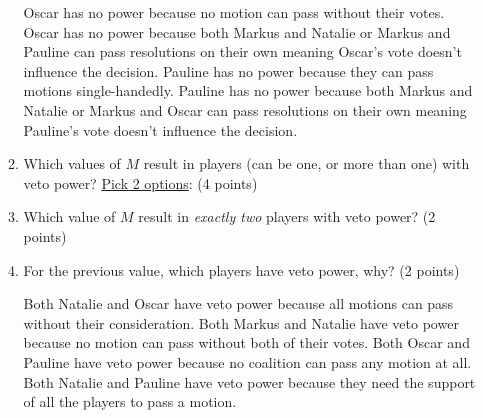 \documentclass[12pt]{exam}
\begin{document}
\begin{enumerate}
\begin{enumerate}
\begin{checkboxes}
    \choice Oscar has no power because no motion can pass without their votes.
    \choice Oscar has no power because both Markus and Natalie or Markus and Pauline can pass resolutions on their own meaning Oscar's vote doesn't influence the decision.
    \choice Pauline has no power because they can pass motions single-handedly.
    \choice Pauline has no power because both Markus and Natalie or Markus and Oscar can pass resolutions on their own meaning Pauline's vote doesn't influence the decision.
\end{checkboxes}
\vfill
\item Which values of $M$ result in players (can be one, or more than one) with veto power? \underline{Pick 2 options}: (4 points)
\begin{checkboxes}
\end{checkboxes}
\vfill
\item Which value of $M$ result in \emph{exactly two} players with veto power? (2 points)
\begin{checkboxes}
\end{checkboxes}
\vfill
\item \label{lastQnSec2} For the previous value, which players have veto power, why? (2 points)
\begin{checkboxes}
    \choice Both Natalie and Oscar have veto power because all motions can pass without their consideration.
    \choice Both Markus and Natalie have veto power because no motion can pass without both of their votes.
    \choice Both Oscar and Pauline have veto power because no coalition can pass any motion at all.
    \choice Both Natalie and Pauline have veto power because they need the support of all the players to pass a motion.
\end{checkboxes}
\vfill
\end{enumerate}
\newpage


\end{enumerate}
\end{document}

